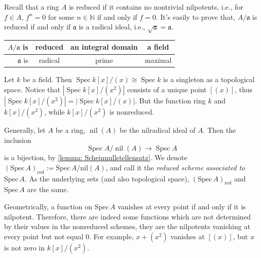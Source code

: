 \documentclass[11pt]{article}
\newcommand{\Spec}{\operatorname{Spec}}
\begin{document}
Recall that a ring $ A $ is reduced if it contains no nontrivial nilpotents, i.e., 
for $ f \in A $, $ f^{n} = 0 $ for some $ n \in \mathbb{N} $ if and only if $ f = 0 $. 
It's easily to prove that, $ A / \mathfrak{a} $ is reduced if and only if $ \mathfrak{a} $ is 
a radical ideal, i.e., $ \sqrt{\mathfrak{a}} = \mathfrak{a} $. 

\begin{center}
    \begin{tabular}{|r |c |c |c|}
        \hline
        $ A / \mathfrak{a} $ is & reduced & an integral domain & a field \\
        \hline
        $ \mathfrak{a} $ is  & radical & prime & maximal \\
        \hline
    \end{tabular}
\end{center}

\begin{example}
    Let $ k $ be a field. Then $ \Spec k[x]/(x) \cong \Spec k $ is a singleton as a topological space. 
    Notice that $ |\Spec k[x] / (x^{2})| $ consists of a unique point $ [(x)] $, 
    thus $ |\Spec k[x] / (x^{2})| = |\Spec k[x]/(x)| $. 
    But the function ring $ k $ and $ k[x] / (x^{2}) $, while $ k[x] / (x^{2}) $ is nonreduced. 

    Generally, let $ A $ be a ring, $ \operatorname{nil}(A) $ be the nilradical ideal of $ A $. 
    Then the inclusion 
    $$ \Spec A / \operatorname{nil}(A) \to \Spec A $$
    is a bijection, by \autoref{lemma: Scheinnullstellensatz}. 
    We denote $(\mathrm{Spec}\,A)_{\mathrm{red}}:=\mathrm{Spec}\,A / \mathrm{nil}(A)$, 
    and call it the \emph{reduced scheme associated to} $\mathrm{Spec}\,A$. 
    As the underlying sets (and also topological space), 
    $(\mathrm{Spec}\,A)_{\mathrm{red}}$ and $\mathrm{Spec}\,A$ are the same. 

    Geometrically, a function on $\mathrm{Spec}\,A$ vanishes at every point if and only if 
    it is nilpotent. Therefore, there are indeed some functions which are 
    not determined by their values in the nonreduced schemes, 
    they are the nilpotents vanishing at every point but not equal $0$. 
    For example, $ x + (x^{2}) $ vanishes at $ [(x)] $, but $ x $ is not zero in $ k[x] / (x^{2}) $. 
\end{example}
\end{document}
